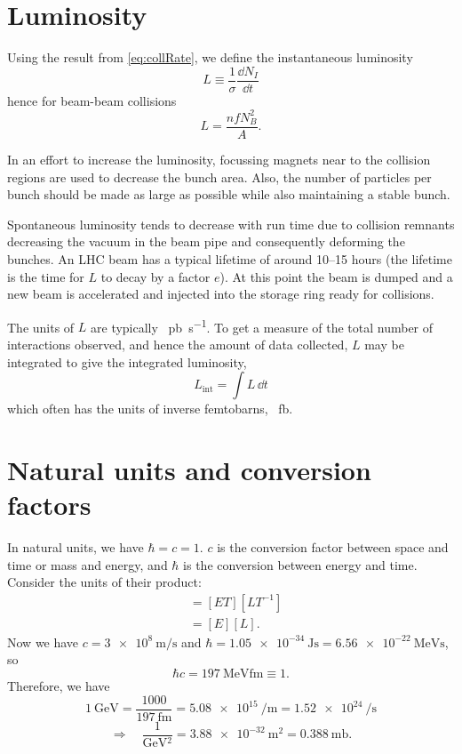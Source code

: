 \documentclass{report}
\begin{document}
\section{Luminosity}
Using the result from \eqref{eq:collRate}, we define the instantaneous luminosity
\begin{equation}\boxed{
L \equiv \frac{1}{\sigma} \frac{\dd N_I}{\dd t}
}\end{equation}
hence for beam-beam collisions
\begin{equation}
L = \frac{n f N_B^2}{A}.
\end{equation}

In an effort to increase the luminosity, focussing magnets near to the collision regions are used to decrease the bunch area. Also, the number of particles per bunch should be made as large as possible while also maintaining a stable bunch.

Spontaneous luminosity tends to decrease with run time due to collision remnants decreasing the vacuum in the beam pipe and consequently deforming the bunches. An LHC beam has a typical lifetime of around 10--15 hours (the lifetime is the time for $L$ to decay by a factor $e$). At this point the beam is dumped and a new beam is accelerated and injected into the storage ring ready for collisions.

The units of $L$ are typically \si{\per \pico\barn \per \second}. To get a measure of the total number of interactions observed, and hence the amount of data collected, $L$ may be integrated to give the integrated luminosity,
\begin{equation}\boxed{
L_\text{int} = \int L \, \dd t
}
\end{equation}
which often has the units of inverse femtobarns, \si{\per \femto \barn}.

\section{Natural units and conversion factors}
In natural units, we have $\hbar = c = 1$. $c$ is the conversion factor between space and time or mass and energy, and $\hbar$ is the conversion between energy and time. Consider the units of their product:
\begin{align}
[\hbar c] &= [ET][LT^{-1}] \nonumber \\
&= [E][L].
\end{align}
Now we have $c = \SI{3e8}{\meter\per\second}$ and $\hbar = \SI{1.05e-34}{\joule\second} = \SI{6.56e-22}{\mega\electronvolt\second}$, so
\begin{equation}\boxed{
\hbar c = \SI{197}{\mega \electronvolt \femto \meter} \equiv 1}.
\end{equation}
Therefore, we have
\begin{equation}
\SI{1}{\giga\electronvolt} = \frac{1000}{\SI{197}{\femto\meter}} = \SI{5.08e15}{\per\meter} = \SI{1.52e24}{\per\second}
\end{equation}
\begin{equation}
\Rightarrow\quad \frac{1}{\si{\giga\electronvolt^2}} = \SI{3.88e-32}{\meter^2} = \SI{0.388}{\milli\barn}.
\end{equation}
\end{document}
